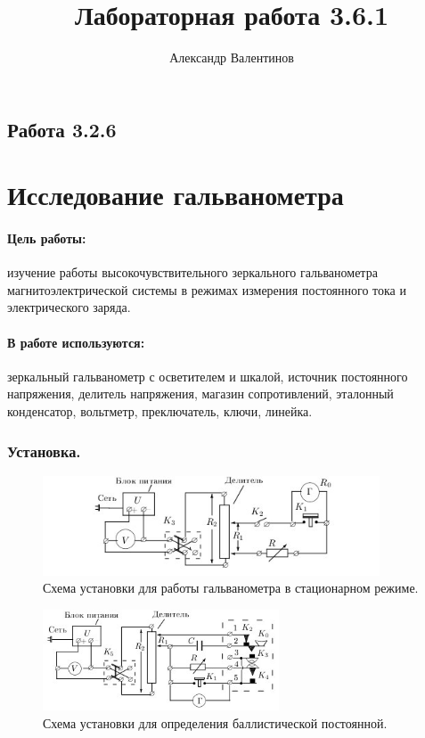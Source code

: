 \documentclass{article}
\author{Александр Валентинов}
\title{Лабораторная работа 3.6.1}
\begin{document}
   \subsection*{Работа 3.2.6}
   \section*{Исследование гальванометра}
   
   \paragraph{Цель работы:} изучение работы высокочувствительного зеркального гальванометра магнитоэлектрической системы в режимах измерения постоянного тока и электрического заряда.
   
   \paragraph{В работе используются:} зеркальный гальванометр с осветителем и шкалой, источник постоянного напряжения, делитель напряжения, магазин сопротивлений, эталонный конденсатор, вольтметр, преключатель, ключи, линейка.

   \subsubsection*{Установка.}
   \begin{figure}[h]
   \centering
   \includegraphics[width=10cm]{fig1.jpg} 
   \caption{Схема установки для работы гальванометра в стационарном режиме.} 
   \label{fig.1} 
   \end{figure}

   \begin{figure}[h]
   \centering
   \includegraphics[width=7cm]{fig2.jpg} 
   \caption{Схема установки для определения баллистической постоянной.} 
   \label{fig.2} 
   \end{figure}
\end{document}
